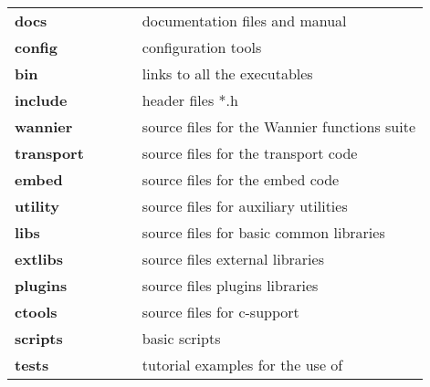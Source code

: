 \begin{tabular}{lll}
{\bf docs}          & $\qquad$  &   documentation files and manual \\
{\bf config}        & $\qquad$  &   configuration tools \\
{\bf bin}           & $\qquad$  &   links to all the executables \\
{\bf include}       & $\qquad$  &   header files *.h \\
{\bf wannier}       & $\qquad$  &   source files for the Wannier functions suite \\
{\bf transport}     & $\qquad$  &   source files for the transport code \\
{\bf embed}         & $\qquad$  &   source files for the embed code \\
{\bf utility}       & $\qquad$  &   source files for auxiliary utilities\\
{\bf libs}          & $\qquad$  &   source files for basic common libraries \\
{\bf extlibs}       & $\qquad$  &   source files external libraries \\
{\bf plugins}       & $\qquad$  &   source files plugins libraries \\
{\bf ctools}        & $\qquad$  &   source files for c-support\\
{\bf scripts}       & $\qquad$  &   basic scripts\\
{\bf tests}         & $\qquad$  &   tutorial examples for the use of \WANT{}\\
\end{tabular}


